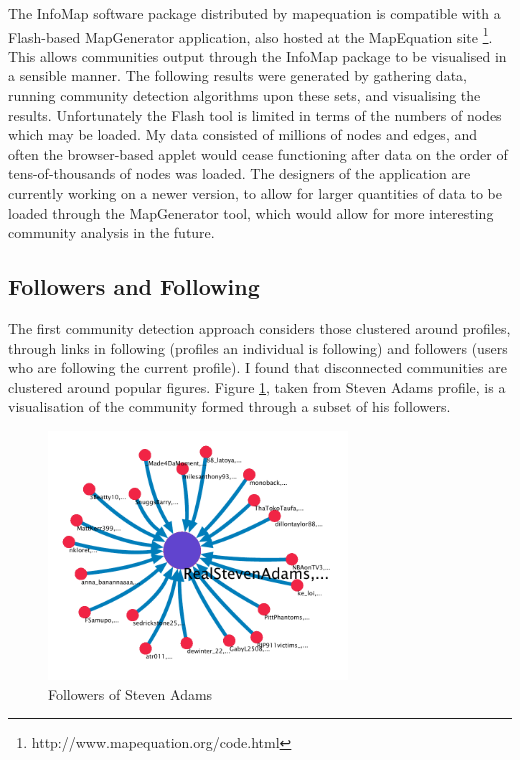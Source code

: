 The InfoMap software package distributed by mapequation is compatible with a Flash-based MapGenerator application, also hosted at the MapEquation site \footnote{http://www.mapequation.org/code.html}. This allows communities output through the InfoMap package to be visualised in a sensible manner. The following results were generated by gathering data, running community detection algorithms upon these sets, and visualising the results. Unfortunately the Flash tool is limited in terms of the numbers of nodes which may be loaded. My data consisted of millions of nodes and edges, and often the browser-based applet would cease functioning after data on the order of tens-of-thousands of nodes was loaded. The designers of the application are currently working on a newer version, to allow for larger quantities of data to be loaded through the MapGenerator tool, which would allow for more interesting community analysis in the future. 

\subsection{Followers and Following}

The first community detection approach considers those clustered around profiles, through links in following (profiles an individual is following) and followers (users who are following the current profile). I found that disconnected communities are clustered around popular figures. Figure \ref{fig:stevenadamsfollowers}, taken from Steven Adams profile, is a visualisation of the community formed through a subset of his followers. 

\begin{figure}[h!]
\begin{center}
\centering
\includegraphics[width=300px]{Images/steven_adams_followers.pdf}
\caption{Followers of Steven Adams}
\label{fig:stevenadamsfollowers}
\end{center}
\end{figure}

